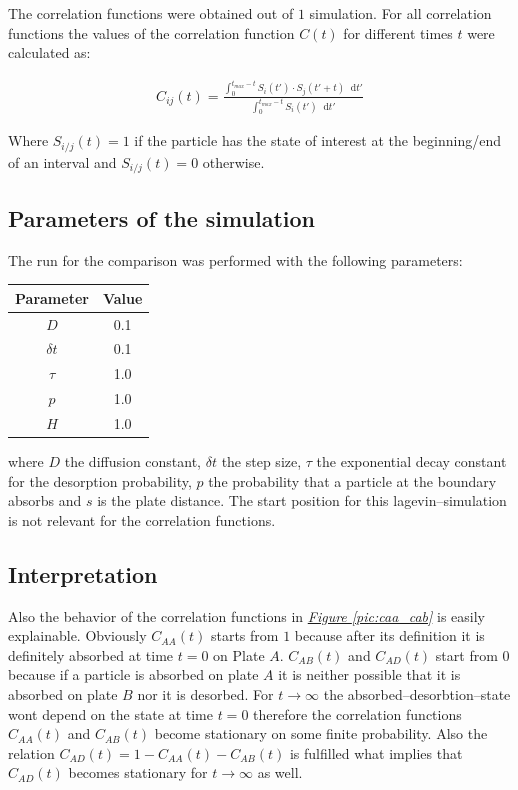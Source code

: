 \documentclass[a4paper, parskip=half]{scrartcl}
\newcommand{\diff}{\mathop{}\!\mathrm{d}}
\newcommand{\myFigRef}[1]{\textit{\hyperref[#1]{Figure \ref*{#1}}}}
\begin{document}
The correlation functions were obtained out of $1$ simulation. For all correlation functions the values of the correlation function $C(t)$ for different times $t$ were calculated as:

\begin{align}
  C_{ij}(t) = \frac{\int_0^{t_{max}-t} S_i(t') \cdot S_j(t' + t) \diff t'}{\int_0^{t_{max}-t} S_i(t') \diff t'}
\end{align}

Where $S_{i/j}(t) = 1$ if the particle has the state of interest at the beginning/end of an interval and $S_{i/j}(t) = 0$ otherwise.

\subsection{Parameters of the simulation}
The run for the comparison was performed with the following parameters:
\begin{center}
\begin{tabular}{c|c}
Parameter & Value \\\hline
$D$ & 0.1 \\
$\delta t$ & 0.1 \\
$\tau$ & 1.0 \\
$p$ & 1.0 \\
$H$ & 1.0
\end{tabular}
\end{center}

where $D$ the diffusion constant, $\delta t$ the step size, $\tau$ the exponential decay constant for the desorption probability, $p$ the probability that a particle at the boundary absorbs and $s$ is the plate distance. The start position for this lagevin--simulation is not relevant for the correlation functions. 

\subsection{Interpretation}

Also the behavior of the correlation functions in \myFigRef{pic:caa_cab} is easily explainable. Obviously $C_{AA}(t)$ starts from $1$ because after its definition it is definitely absorbed at time $t=0$ on Plate $A$. $C_{AB}(t)$ and $C_{AD}(t)$ start from $0$ because if a particle is absorbed on plate $A$ it is neither possible that it is absorbed on plate $B$ nor it is desorbed. For $t \rightarrow \infty$ the absorbed--desorbtion--state wont depend on the state at time $t = 0$ therefore the correlation functions $C_{AA}(t)$ and $C_{AB}(t)$ become stationary on some finite probability. Also the relation $C_{AD}(t) = 1 - C_{AA}(t) - C_{AB}(t)$ is fulfilled what implies that $C_{AD}(t)$ becomes stationary for $t \rightarrow \infty$ as well.
\end{document}
